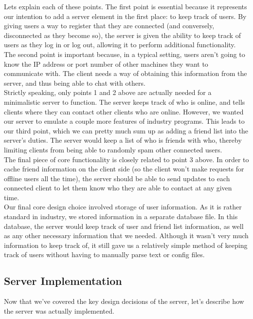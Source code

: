 \documentclass[9pt,twocolumn]{article}
\begin{document}
Lets explain each of these points. The first point is essential because it represents
our intention to add a server element in the first place: to keep track of users.
By giving users a way to register that they are connected (and conversely,
disconnected as they become so), the server is given the ability to keep track of
users as they log in or log out, allowing it to perform additional functionality.\\

The second point is important because, in a typical setting, users aren't going to
know the IP address or port number of other machines they want to communicate with.
The client needs a way of obtaining this information from the server, and thus being
able to chat with others.\\

Strictly speaking, only points 1 and 2 above are actually needed for a minimalistic
server to function. The server keeps track of who is online, and tells clients where
they can contact other clients who are online. However, we wanted our server to
emulate a couple more features of industry programs. This leads to our third point,
which we can pretty much sum up as adding a friend list into the server's duties.
The server would keep a list of who is friends with who, thereby limiting clients
from being able to randomly spam other connected users. \\

The final piece of core functionality is closely related to point 3 above. In order
to cache friend information on the client side (so the client won't make requests
for offline users all the time), the server should be able to send updates to each
connected client to let them know who they are able to contact at any given time. \\ 

Our final core design choice involved storage of user information. As it is rather standard
in industry, we stored information in a separate database file. In this database, the server
would keep track of user and friend list information, as well as any other necessary
information that we needed. Although it wasn't very much information to keep track of, 
it still gave us a relatively simple method of keeping track of users without having
 to manually parse text or config files.\\
 
\subsection{Server Implementation}
Now that we've covered the key design decisions of the server, let's describe how the server
was actually implemented.\\
\end{document}
